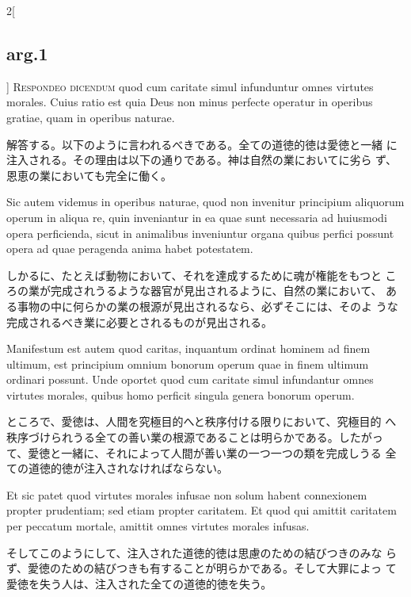 \documentclass[paper=a4paper,fontsize=10pt,jafontsize=9pt,titlepage]{jlreq}
\begin{document}
\begin{paracol}{2}[\subsection{arg.1}]
{\scshape Respondeo dicendum} quod cum caritate simul infunduntur
 omnes virtutes morales. Cuius ratio est quia Deus non minus perfecte
 operatur in operibus gratiae, quam in operibus naturae.

\switchcolumn

解答する。以下のように言われるべきである。全ての道徳的徳は愛徳と一緒
 に注入される。その理由は以下の通りである。神は自然の業においてに劣ら
 ず、恩恵の業においても完全に働く。

\switchcolumn*

Sic autem videmus in operibus naturae, quod non invenitur principium
 aliquorum operum in aliqua re, quin inveniantur in ea quae sunt
 necessaria ad huiusmodi opera perficienda, sicut in animalibus
 inveniuntur organa quibus perfici possunt opera ad quae peragenda
 anima habet potestatem.

\switchcolumn

しかるに、たとえば動物において、それを達成するために魂が権能をもつと
 ころの業が完成されうるような器官が見出されるように、自然の業において、
 ある事物の中に何らかの業の根源が見出されるなら、必ずそこには、そのよ
 うな完成されるべき業に必要とされるものが見出される。

\switchcolumn*

Manifestum est autem quod caritas, inquantum ordinat hominem ad finem
 ultimum, est principium omnium bonorum operum quae in finem ultimum
 ordinari possunt. Unde oportet quod cum caritate simul infundantur
 omnes virtutes morales, quibus homo perficit singula genera bonorum
 operum.

\switchcolumn

ところで、愛徳は、人間を究極目的へと秩序付ける限りにおいて、究極目的
 へ秩序づけられうる全ての善い業の根源であることは明らかである。したがっ
 て、愛徳と一緒に、それによって人間が善い業の一つ一つの類を完成しうる
 全ての道徳的徳が注入されなければならない。

\switchcolumn*

Et sic patet quod virtutes morales infusae non solum habent
 connexionem propter prudentiam; sed etiam propter caritatem. Et quod
 qui amittit caritatem per peccatum mortale, amittit omnes virtutes
 morales infusas.

\switchcolumn

そしてこのようにして、注入された道徳的徳は思慮のための結びつきのみな
 らず、愛徳のための結びつきも有することが明らかである。そして大罪によっ
 て愛徳を失う人は、注入された全ての道徳的徳を失う。

\switchcolumn*[\subsection{ad.1}]


\end{paracol}
\end{document}
